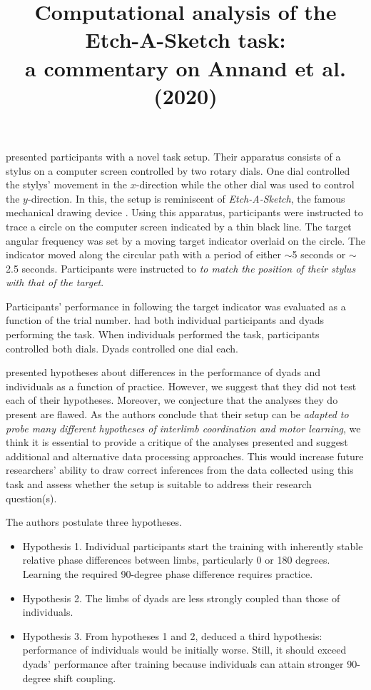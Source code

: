 \documentclass[11pt]{article}
\title{Computational analysis of the Etch-A-Sketch task:\\ a commentary on Annand et al. (2020)}
\author{}
\newcommand{\myquote}[1]{\textit{#1}}
\begin{document}
\maketitle


\citet{Annand2020} presented participants with a novel task setup. Their apparatus consists of a stylus on a computer screen controlled by two rotary dials. One dial controlled the stylys' movement in the $x$-direction while the other dial was used to control the $y$-direction. In this, the setup is reminiscent of \textit{Etch-A-Sketch}, the famous mechanical drawing device \citep{EtchASketch}. Using this apparatus, participants were instructed to trace a circle on the computer screen indicated by a thin black line. The target angular frequency was set by a moving target indicator overlaid on the circle. The indicator moved along the circular path with a period of either $\sim$5 seconds or  $\sim$2.5 seconds. Participants were instructed to \myquote{to match the position of their stylus with that of the target}.

Participants' performance in following the target indicator was evaluated as a function of the trial number. \citet{Annand2020} had both individual participants and dyads performing the task. When individuals performed the task, participants controlled both dials. Dyads controlled one dial each.

\citet{Annand2020} presented hypotheses about differences in the performance of dyads and individuals as a function of practice. However, we suggest that they did not test each of their hypotheses. Moreover, we conjecture that the analyses they do present are flawed. As the authors conclude that their setup can be \myquote{adapted to probe many different hypotheses of interlimb coordination and motor learning}, we think it is essential to provide a critique of the analyses presented and suggest additional and alternative data processing approaches. This would increase future researchers' ability to draw correct inferences from the data collected using this task and assess whether the setup is suitable to address their research question(s). 

The authors postulate three hypotheses.

\begin{itemize}
	\item{Hypothesis 1.} Individual participants start the training with inherently stable relative phase differences between limbs, particularly 0 or 180 degrees. Learning the required 90-degree phase difference requires practice.
	\item{Hypothesis 2.} The limbs of dyads are less strongly coupled than those of individuals.
	\item{Hypothesis 3.} From hypotheses 1 and 2, \citet{Annand2020} deduced a third hypothesis: performance of individuals would be initially worse. Still, it should exceed dyads' performance after training because individuals can attain stronger 90-degree shift coupling.
\end{itemize}
\end{document}
